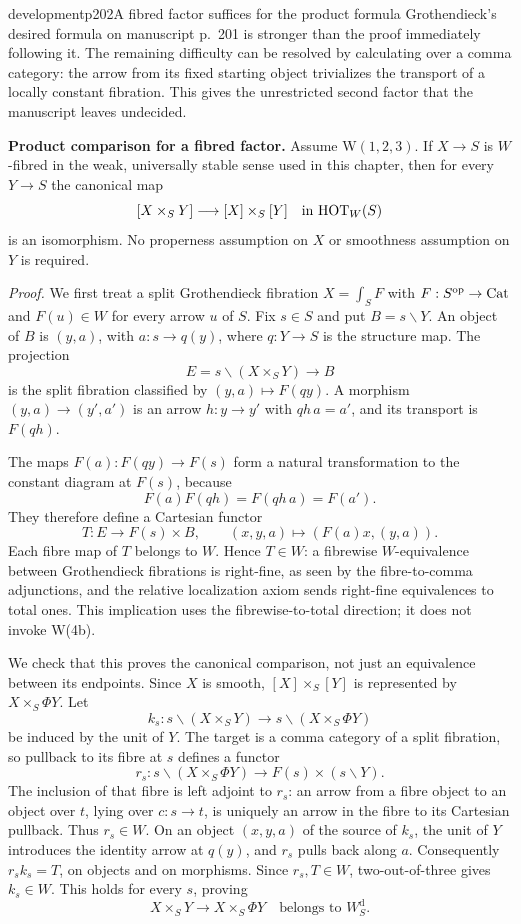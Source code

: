 \begin{dcomment}{development}{p202}{A fibred factor suffices for the product formula}
Grothendieck's desired formula on manuscript p.~201 is stronger than the proof immediately following it. The remaining difficulty can be resolved by calculating over a comma category: the arrow from its fixed starting object trivializes the transport of a locally constant fibration. This gives the unrestricted second factor that the manuscript leaves undecided.

\textbf{Product comparison for a fibred factor.}\ours\enspace
Assume W$(1,2,3)$. If $X\to S$ is $W$-fibred in the weak, universally stable sense used in this chapter, then for every $Y\to S$ the canonical map
\[
 [X\times_S Y]\longrightarrow [X]\times_S[Y]
 \quad\text{in }\mathrm{HOT}_W(S)
\]
is an isomorphism. No properness assumption on $X$ or smoothness assumption on $Y$ is required.

\emph{Proof.} We first treat a split Grothendieck fibration $X=\int_S F$ with $F:S^{\mathrm{op}}\to\mathrm{Cat}$ and $F(u)\in W$ for every arrow $u$ of $S$. Fix $s\in S$ and put $B=s\backslash Y$. An object of $B$ is $(y,a)$, with $a:s\to q(y)$, where $q:Y\to S$ is the structure map. The projection
\[
 E=s\backslash(X\times_S Y)\longrightarrow B
\]
is the split fibration classified by $(y,a)\mapsto F(qy)$. A morphism $(y,a)\to(y',a')$ is an arrow $h:y\to y'$ with $qh\,a=a'$, and its transport is $F(qh)$.

The maps $F(a):F(qy)\to F(s)$ form a natural transformation to the constant diagram at $F(s)$, because
\[
 F(a)F(qh)=F(qh\,a)=F(a').
\]
They therefore define a Cartesian functor
\[
 T:E\longrightarrow F(s)\times B,
 \qquad (x,y,a)\longmapsto (F(a)x,(y,a)).
\]
Each fibre map of $T$ belongs to $W$. Hence $T\in W$: a fibrewise $W$-equivalence between Grothendieck fibrations is right-fine, as seen by the fibre-to-comma adjunctions, and the relative localization axiom sends right-fine equivalences to total ones. This implication uses the fibrewise-to-total direction; it does not invoke W(4b).

We check that this proves the canonical comparison, not just an equivalence between its endpoints. Since $X$ is smooth, $[X]\times_S[Y]$ is represented by $X\times_S\Phi Y$. Let
\[
 k_s:s\backslash(X\times_S Y)
       \longrightarrow s\backslash(X\times_S\Phi Y)
\]
be induced by the unit of $Y$. The target is a comma category of a split fibration, so pullback to its fibre at $s$ defines a functor
\[
 r_s:s\backslash(X\times_S\Phi Y)
          \longrightarrow F(s)\times(s\backslash Y).
\]
The inclusion of that fibre is left adjoint to $r_s$: an arrow from a fibre object to an object over $t$, lying over $c:s\to t$, is uniquely an arrow in the fibre to its Cartesian pullback. Thus $r_s\in W$. On an object $(x,y,a)$ of the source of $k_s$, the unit of $Y$ introduces the identity arrow at $q(y)$, and $r_s$ pulls back along $a$. Consequently $r_s k_s=T$, on objects and on morphisms. Since $r_s,T\in W$, two-out-of-three gives $k_s\in W$. This holds for every $s$, proving
\[
 X\times_S Y\longrightarrow X\times_S\Phi Y
       \quad\text{belongs to }W_S^{\mathrm d}.
\]


\end{dcomment}

